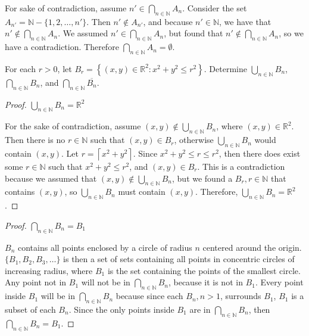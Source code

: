 \documentclass[12 pt]{exam}
\begin{document}
\begin{questions}
\begin{solution}

For sake of contradiction, assume $n' \in \bigcap_{n\in\mathbb{N}}A_n$. Consider the set $A_{n'} = \mathbb{N} - \{1, 2, \dots, n'\}$. Then $n' \notin A_{n'}$, and because $n' \in \mathbb{N}$, we have that $n' \notin \bigcap_{n\in\mathbb{N}}A_n$. We assumed $n' \in \bigcap_{n\in\mathbb{N}}A_n$, but found that $n' \notin \bigcap_{n\in\mathbb{N}}A_n$, so we have a contradiction. Therefore $\bigcap_{n\in\mathbb{N}}A_n = \emptyset$.
\end{solution}

\question For each $r>0$, let $B_r=\left\{(x,y) \in \mathbb{R}^2 : x^2+y^2 \leq r^2 \right\}$. Determine $\bigcup_{n\in\mathbb{N} }B_n$, $\bigcap_{n\in\mathbb{N}} B_n$, and $\bigcap_{n\in\mathbb{N}} \overline{B_n}$.
\begin{solution}
\begin{proof} $\bigcup_{n\in\mathbb{N}} B_n = \mathbb{R}^2$

For the sake of contradiction, assume $(x, y) \notin \bigcup_{n\in\mathbb{N}} B_n$, where $(x, y) \in \mathbb{R}^2$. Then there is no $r \in \mathbb{N}$ such that $(x, y) \in B_r$, otherwise $\bigcup_{n\in\mathbb{N}} B_n$ would contain $(x, y)$. Let $r = \left\lceil x^2 + y^2 \right\rceil$. Since $x^2 + y^2 \le r \le r^2$, then there does exist some $r \in \mathbb{N}$ such that $x^2 + y^2 \le r^2$, and $(x, y) \in B_r$. This is a contradiction because we assumed that $(x, y) \notin \bigcup_{n\in\mathbb{N}}B_n$, but we found a $B_r, r\in \mathbb{N}$ that contains $(x, y)$, so $\bigcup_{n\in\mathbb{N}} B_n$ must contain $(x, y)$. Therefore, $\bigcup_{n\in\mathbb{N}} B_n = \mathbb{R}^2$.
\end{proof}

\begin{proof} $\bigcap_{n\in\mathbb{N}}B_n = B_1$

$B_n$ contains all points enclosed by a circle of radius $n$ centered around the origin. $\{B_1, B_2, B_3, \dots\}$ is then a set of sets containing all points in concentric circles of increasing radius, where $B_1$ is the set containing the points of the smallest circle. Any point not in $B_1$ will not be in $\bigcap_{n\in\mathbb{N}}B_n$, because it is not in $B_1$. Every point inside $B_1$ will be in $\bigcap_{n\in\mathbb{N}}B_n$ because since each $B_n, n > 1$, surrounds $B_1$, $B_1$ is a subset of each $B_n$. Since the only points inside $B_1$ are in $\bigcap_{n\in\mathbb{N}}B_n$, then $\bigcap_{n\in\mathbb{N}}B_n = B_1$.
\end{proof}



\end{solution}
\end{questions}
\end{document}
